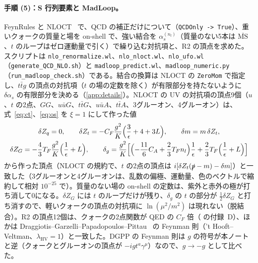 \documentclass[a4paper,10pt]{ltjsarticle}
\newcommand{\MSbar}{\overline{\mathrm{MS}}}
\begin{document}
\paragraph{手順 (5)：S 行列要素と MadLoop。}FeynRules と NLOCT~\cite{degrande15} で、QCD の補正だけについて（\texttt{QCDOnly -> True}）、重いクォークの質量と場を on-shell で、強い結合を $\alpha_s^{(n_l)}$（質量のない5本は $\MSbar$、$t$ のループはゼロ運動量で引く）で繰り込む対抗項と、R2 の頂点を求めた。スクリプトは \texttt{nlo\_renormalize.wl}、\texttt{nlo\_nloct.wl}、\texttt{nlo\_ufo.wl}（\texttt{generate\_QCD\_NLO.sh}）と \texttt{madloop\_predict.wl}、\texttt{madloop\_numeric.py}（\texttt{run\_madloop\_check.sh}）である。結合の換算は NLOCT の \texttt{ZeroMom} で指定し、$t\bar tg$ の頂点の対抗項（$t$ の場の定数を除く）が有限部分を持たないように $\delta\alpha_s$ の有限部分を決める（\ref{app:details}）。NLOCT の UV の対抗項の頂点9個（$u$、$t$ の2点、$GG$、$u\bar uG$、$t\bar tG$、$u\bar uA$、$t\bar tA$、3グルーオン、4グルーオン）は、式~\eqref{eq:ct}、\eqref{eq:os} を $\xi=1$ にして作った値
\begin{equation*}
\begin{gathered}
\delta Z_q=0,\qquad \delta Z_t=-C_F\frac{g^2}{K}\Bigl(\frac3\epsilon+4+3L\Bigr),\qquad \delta m=m\,\delta Z_t,\\
\delta Z_G=-\frac43T_F\frac{g^2}{K}\Bigl(\frac1\epsilon+L\Bigr),\qquad
\delta_g=\frac{g^2}{K}\Bigl[\Bigl(-\frac{11}6C_A+\frac23T_Fn_l\Bigr)\frac1\epsilon+\frac23T_F\Bigl(\frac1\epsilon+L\Bigr)\Bigr]
\end{gathered}
\end{equation*}
から作った頂点（NLOCT の規約で、$t$ の2点の頂点は $i[\delta Z_t(\slashed p-m)-\delta m]$）と一致した（3グルーオンと4グルーオンは、乱数の偏極、運動量、色のベクトルで縮約して相対 $10^{-25}$ で）。質量のない場の on-shell の定数は、紫外と赤外の極が打ち消して0になる。$\delta Z_G$ には $t$ のループだけが残り、$\delta_g$ の $t$ の部分が $\frac12\delta Z_G$ と打ち消すので、軽いクォークの頂点の対抗項に $\ln(\mu^2/m^2)$ は現れない（脱結合）。R2 の頂点12個は、クォークの2点関数が QED の $C_F$ 倍（\cite{qednote} の付録~D）、ほかは Draggiotis--Garzelli--Papadopoulos--Pittau~\cite{dgpp09} の Feynman 則（'t Hooft--Veltman、$\lambda_{\mathrm{HV}}=1$）と一致した。DGPP の Feynman 則は $g$ の符号が本ノートと逆（クォークとグルーオンの頂点が $-igt^a\gamma^\mu$）なので、$g\to-g$ として比べた。
\end{document}
